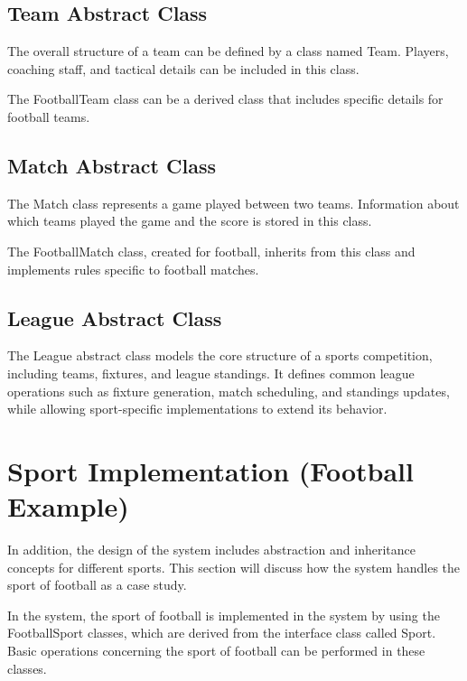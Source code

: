 \documentclass[12pt, a4paper]{article}
\begin{document}
\subsection{Team Abstract Class}

The overall structure of a team can be defined by a class named Team. Players, coaching
staff, and tactical details can be included in this class.

The FootballTeam class can be a derived class that includes specific details for football teams.

\subsection{Match Abstract Class}

The Match class represents a game played between two teams. Information about which
teams played the game and the score is stored in this class.

The FootballMatch class, created for football, inherits from this class and implements rules
specific to football matches.

\subsection{League Abstract Class}

The League abstract class models the core structure of a sports competition, including teams,
fixtures, and league standings. It defines common league operations such as fixture
generation, match scheduling, and standings updates, while allowing sport-specific
implementations to extend its behavior.

\section{Sport Implementation (Football Example)}

In addition, the design of the system includes abstraction and inheritance concepts for
different sports. This section will discuss how the system handles the sport of football as a
case study.

In the system, the sport of football is implemented in the system by using the FootballSport
classes, which are derived from the interface class called Sport. Basic operations concerning
the sport of football can be performed in these classes.
\end{document}
